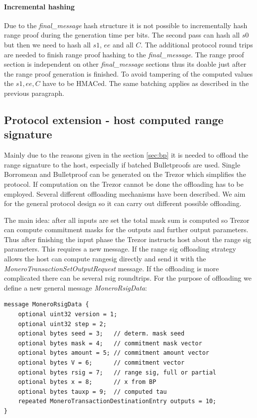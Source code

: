 \documentclass[]{article}
\begin{document}
\paragraph{Incremental hashing}
Due to the \emph{final\_message} hash structure it is not possible to incrementally hash range proof during the generation time per bits. The second pass can hash all $s0$ but then we need to hash all $s1$, $ee$ and all $C$. The additional protocol round trips are needed to finish range proof hashing to the \emph{final\_message}. The range proof section is independent on other \emph{final\_message} sections thus its doable just after the range proof generation is finished. To avoid tampering of the computed values the $s1, ee, C$ have to be HMACed. The same batching applies as described in the previous paragraph. 

\subsection{Protocol extension - host computed range signature}

Mainly due to the reasons given in the section \ref{sec:bp} it is needed to offload the range signature to the host, especially if batched Bulletproofs are used. Single Borromean and Bulletproof can be generated on the Trezor which simplifies the protocol. If computation on the Trezor cannot be done the offloading has to be employed. 
Several different offloading mechanisms have been described. We aim for the general protocol design so it can carry out different possible offloading. 

The main idea: after all inputs are set the total mask sum is computed so Trezor can compute commitment masks for the outputs and further output parameters. Thus after finishing the input phase the Trezor instructs host about the range sig parameters. This requires a new message. If the range sig offloading strategy allows the host can compute rangesig directly and send it with the \emph{MoneroTransactionSetOutputRequest} message. If the offloading is more complicated there can be several rsig roundtrips. For the purpose of offloading we define a new general message \emph{MoneroRsigData}:

\begin{lstlisting}
message MoneroRsigData {
	optional uint32 version = 1;
	optional uint32 step = 2;
	optional bytes seed = 3;   // determ. mask seed
	optional bytes mask = 4;   // commitment mask vector
	optional bytes amount = 5; // commitment amount vector
	optional bytes V = 6;      // commitment vector
	optional bytes rsig = 7;   // range sig, full or partial
	optional bytes x = 8;      // x from BP
	optional bytes tauxp = 9;  // computed tau
	repeated MoneroTransactionDestinationEntry outputs = 10;
}

\end{lstlisting}
\end{document}
